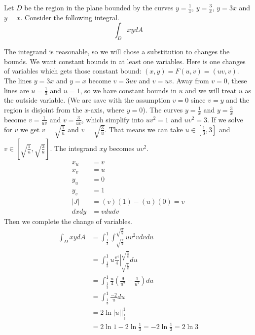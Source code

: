 \documentclass[fleqn,letterpaper]{report}
\begin{document}
\begin{example} 
Let $D$ be the region in the plane bounded by the curves $y =
\frac{1}{x}$, $y = \frac{3}{x}$, $y = 3x$ and $y = x$.
Consider the following integral.
\begin{equation*}
\int_D xy dA
\end{equation*}
\newpage

The integrand is reasonable, so we will chose a substitution
to changes the bounds. We want constant bounds in at least one
variables. Here is one changes of variables which gets those
constant bound: $(x,y) = F(u,v) = (uv,v)$. The lines $y=3x$
and $y=x$ become $v=3uv$ and $v=uv$. Away from $v=0$, these
lines are $u=\frac{1}{3}$ and $u=1$, so we have constant
bounds in $u$ and we will treat $u$ as the outside variable.
(We are save with the assumption $v=0$ since $v=y$ and the
region is disjoint from the $x$-axis, where $y=0$).
The curves $y = \frac{1}{x}$ and $y = \frac{3}{x}$ become $v =
\frac{1}{uv}$ and $v = \frac{3}{uv}$, which simplify into
$uv^2 =1$ and $uv^2=3$. If we solve for $v$ we get $v =
\sqrt{\frac{1}{u}}$ and $v = \sqrt{\frac{3}{u}}$. That means
we can take $u \in [\frac{1}{3}, 3]$ and $v \in
\left[\sqrt{\frac{1}{u}}, \sqrt{\frac{3}{u}} \right]$. The
integrand $xy$ becomes $uv^2$.
\begin{align*}
x_u & = v \\
x_v & = u \\
y_u & = 0 \\
y_v & = 1 \\
|J| & = (v)(1) - (u)(0) = v \\
dx dy & = v du dv 
\end{align*}
Then we complete the change of variables.
\begin{align*}
\int_D xy dA & = \int_{\frac{1}{3}}^1
\int_{\sqrt{\frac{1}{u}}}^{\sqrt{\frac{3}{u}}} uv^2 v dv du \\
& = \int_{\frac{1}{3}}^1 \left. u\frac{v^4}{4}
\right|_{\sqrt{\frac{1}{u}}}^{\sqrt{\frac{3}{u}}} du \\
& = \int_{\frac{1}{3}}^1 \frac{u}{4} (\frac{9}{u^2} -
\frac{1}{u^2}) du \\
& = \int_{\frac{1}{3}}^1 \frac{-2}{u} du \\
& = 2 \ln |u| \bigg|_{\frac{1}{3}}^1 \\
& = 2 \ln 1 - 2 \ln \frac{1}{3} = -2 \ln \frac{1}{3} = 2 \ln 3 
\end{align*}
\newpage


\end{example}
\end{document}

